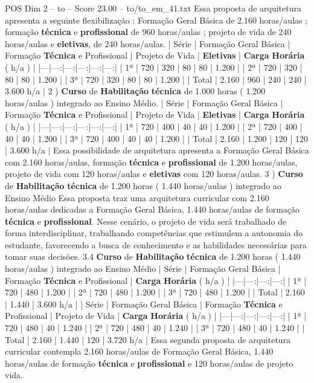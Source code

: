 \begin{textsample}{POS Dim 2 – to – Score 23.00 – to/to\_em\_41.txt}
Essa proposta de arquitetura apresenta a seguinte flexibilização : Formação Geral Básica de 2.160 horas/aulas ; formação \textbf{técnica} e \textbf{profissional} de 960 horas/aulas ; projeto de vida de 240 horas/aulas e \textbf{eletivas}, de 240 horas/aulas. | Série | Formação Geral Básica | Formação \textbf{Técnica} e Profissional | Projeto de Vida | \textbf{Eletivas} | \textbf{Carga} \textbf{Horária} ( h/a ) | |---|---:|---:|---:|---:|---:| | 1ª | 720 | 320 | 80 | 80 | 1.200 | | 2ª | 720 | 320 | 80 | 80 | 1.200 | | 3ª | 720 | 320 | 80 | 80 | 1.200 | | Total | 2.160 | 960 | 240 | 240 | 3.600 h/a | 2 ) \textbf{Curso} de \textbf{Habilitação} \textbf{técnica} de 1.000 horas ( 1.200 horas/aulas ) integrado ao Ensino Médio. | Série | Formação Geral Básica | Formação \textbf{Técnica} e Profissional | Projeto de Vida | \textbf{Eletivas} | \textbf{Carga} \textbf{Horária} ( h/a ) | |---|---:|---:|---:|---:|---:| | 1ª | 720 | 400 | 40 | 40 | 1.200 | | 2ª | 720 | 400 | 40 | 40 | 1.200 | | 3ª | 720 | 400 | 40 | 40 | 1.200 | | Total | 2.160 | 1.200 | 120 | 120 | 3.600 h/a | Essa possibilidade de arquitetura apresenta a Formação Geral Básica com 2.160 horas/aulas, formação \textbf{técnica} e \textbf{profissional} de 1.200 horas/aulas, projeto de vida com 120 horas/aulas e \textbf{eletivas} com 120 horas/aulas. 3 ) \textbf{Curso} de \textbf{Habilitação} \textbf{técnica} de 1.200 horas ( 1.440 horas/aulas ) integrado ao Ensino Médio Essa proposta traz uma arquitetura curricular com 2.160 horas/aulas dedicadas a Formação Geral Básica, 1.440 horas/aulas de formação \textbf{técnica} e \textbf{profissional}.
Nesse cenário, o projeto de vida será trabalhado de forma interdisciplinar, trabalhando competências que estimulem a autonomia do estudante, favorecendo a busca de conhecimento e as habilidades necessárias para tomar suas decisões. 3.4 \textbf{Curso} de \textbf{Habilitação} \textbf{técnica} de 1.200 horas ( 1.440 horas/aulas ) integrado ao Ensino Médio | Série | Formação Geral Básica | Formação \textbf{Técnica} e Profissional | \textbf{Carga} \textbf{Horária} ( h/a ) | |---|---:|---:|---:| | 1ª | 720 | 480 | 1.200 | | 2ª | 720 | 480 | 1.200 | | 3ª | 720 | 480 | 1.200 | | Total | 2.160 | 1.440 | 3.600 h/a | | Série | Formação Geral Básica | Formação \textbf{Técnica} e Profissional | Projeto de Vida | \textbf{Carga} \textbf{Horária} ( h/a ) | |---|---:|---:|---:|---:| | 1ª | 720 | 480 | 40 | 1.240 | | 2ª | 720 | 480 | 40 | 1.240 | | 3ª | 720 | 480 | 40 | 1.240 | | Total | 2.160 | 1.440 | 120 | 3.720 h/a | Essa segunda proposta de arquitetura curricular contempla 2.160 horas/aulas de Formação Geral Básica, 1.440 horas/aulas de formação \textbf{técnica} e \textbf{profissional} e 120 horas/aulas de projeto vida.

\end{textsample}
